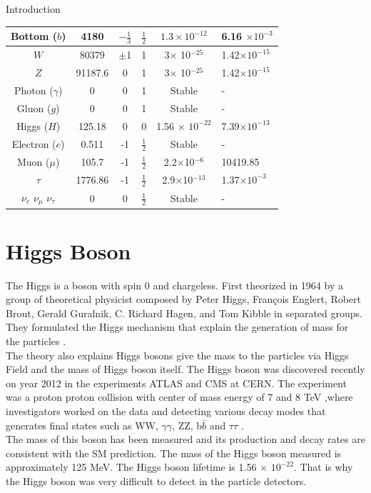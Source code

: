 \begin{chapter}{Introduction}
\begin{table}[!htbp]
\begin{tabular}{|c|c|c|c|c|p{2.5cm}|}
Bottom ($b$)	& 4180 &$-\frac{1}{3}$  &  $\frac{1}{2}$ &$1.3 \times 10^{-12}$   & 6.16 $\times 10^{-3}$\\ 
	\hline 
$W$ 	& 80379 &$\pm$1  & 1 & 3$\times$ 10$^{-25}$ &  1.42$\times 10^{-15}$\\ 
	\hline 
$Z$ & 91187.6 &0  & 1 & 3$\times$ 10$^{-25}$  &1.42$\times 10^{-15}$ \\ 
\hline
Photon ($\gamma$) & 0 &0  &  1&Stable  & - \\ 
\hline
Gluon ($g$)	& 0 &0  &  1&Stable  & - \\ 
	\hline 
Higgs ($H$)	& 125.18 &0  &  0& 1.56 $\times$ $10^{-22}$ & 7.39$\times 10^{-13}$ \\ 
	\hline 
Electron ($e$)& 0.511 & -1 &   $\frac{1}{2}$& Stable & - \\ 
	\hline 
Muon ($\mu$)	& 105.7 & -1  &  $\frac{1}{2}$ & 2.2$\times$10$^{-6}$ & 10419.85 \\ 
	\hline 
$\tau$	& 1776.86 &-1  &  $\frac{1}{2}$ & 2.9$\times$10$^{-13}$ & 1.37$\times 10^{-3}$\\ 
	\hline 
$\nu_e$	$\nu_\mu$ $\nu_\tau$& 0 & 0 &  $\frac{1}{2}$ & Stable &  -\\
	\hline 
\end{tabular} 
\label{SM table}
\end{table}
\newpage


\section{Higgs Boson}
The Higgs is a boson with spin 0 and chargeless. First theorized in 1964 by a group of theoretical physicist composed by Peter Higgs, Fran\c cois Englert, Robert Brout, Gerald Guralnik, C. Richard Hagen, and Tom Kibble in separated groups. They formulated the Higgs mechanism that explain the generation of mass for the particles . \\

The theory also explains Higgs bosons give the mass to the particles via Higgs Field and the mass of Higgs boson itself.  The Higgs boson was discovered recently on year 2012 in the experiments ATLAS and CMS at CERN. The experiment was a proton proton collision with center of mass energy of 7 and 8 TeV ,where investigators worked on the data and detecting various decay modes that generates final states such  as WW, $\gamma \gamma$, ZZ, b$\bar{b}$ and $\tau \tau$ \cite{higgsd}. \\
The mass of this boson has been  measured and its production and decay
rates are  consistent with the SM prediction. The mass of the Higgs boson measured is 
approximately 125 MeV. The Higgs boson lifetime is 1.56 $\times$ $10^{-22}$. That is why the Higgs boson was very difficult to detect in the particle detectors. \\


\end{chapter}

